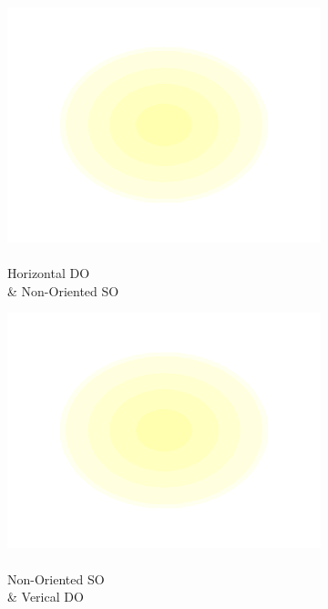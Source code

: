 \documentclass[journal,onecolumn]{IEEEtran}
\begin{document}
\begin{figure}[h]
\begin{subfigure}[b]{0.2\textwidth}
            \includegraphics[width=.85\linewidth]{j_3_4}
            \caption{\\ Horizontal DO \\ \& Non-Oriented SO}
    \end{subfigure}%
    \par \bigskip
    \begin{subfigure}[b]{0.2\textwidth}
            \centering
            \captionsetup{justification=centering}
            \includegraphics[width=.85\linewidth]{j_4_1}
            \caption{\\ Non-Oriented SO \\ \& Verical DO}
    \end{subfigure}%
    \begin{subfigure}[b]{0.2\textwidth}
            \centering
            \captionsetup{justification=centering}

\end{subfigure}
\end{figure}
\end{document}
